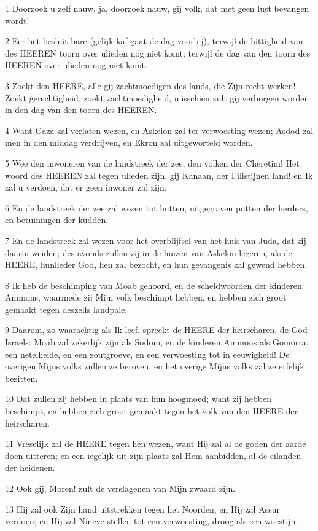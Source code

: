 \par 1 Doorzoek u zelf nauw, ja, doorzoek nauw, gij volk, dat met geen lust bevangen wordt!
\par 2 Eer het besluit bare (gelijk kaf gaat de dag voorbij), terwijl de hittigheid van des HEEREN toorn over ulieden nog niet komt; terwijl de dag van den toorn des HEEREN over ulieden nog niet komt.
\par 3 Zoekt den HEERE, alle gij zachtmoedigen des lands, die Zijn recht werken! Zoekt gerechtigheid, zoekt zachtmoedigheid, misschien zult gij verborgen worden in den dag van den toorn des HEEREN.
\par 4 Want Gaza zal verlaten wezen, en Askelon zal ter verwoesting wezen; Asdod zal men in den middag verdrijven, en Ekron zal uitgeworteld worden.
\par 5 Wee den inwoneren van de landstreek der zee, den volken der Cheretim! Het woord des HEEREN zal tegen ulieden zijn, gij Kanaan, der Filistijnen land! en Ik zal u verdoen, dat er geen inwoner zal zijn.
\par 6 En de landstreek der zee zal wezen tot hutten, uitgegraven putten der herders, en betuiningen der kudden.
\par 7 En de landstreek zal wezen voor het overblijfsel van het huis van Juda, dat zij daarin weiden; des avonds zullen zij in de huizen van Askelon legeren, als de HEERE, hunlieder God, hen zal bezocht, en hun gevangenis zal gewend hebben.
\par 8 Ik heb de beschimping van Moab gehoord, en de scheldwoorden der kinderen Ammons, waarmede zij Mijn volk beschimpt hebben, en hebben zich groot gemaakt tegen deszelfs landpale.
\par 9 Daarom, zo waarachtig als Ik leef, spreekt de HEERE der heirscharen, de God Israels: Moab zal zekerlijk zijn als Sodom, en de kinderen Ammons als Gomorra, een netelheide, en een zoutgroeve, en een verwoesting tot in eeuwigheid! De overigen Mijns volks zullen ze beroven, en het overige Mijns volks zal ze erfelijk bezitten.
\par 10 Dat zullen zij hebben in plaats van hun hoogmoed; want zij hebben beschimpt, en hebben zich groot gemaakt tegen het volk van den HEERE der heirscharen.
\par 11 Vreselijk zal de HEERE tegen hen wezen, want Hij zal al de goden der aarde doen uitteren; en een iegelijk uit zijn plaats zal Hem aanbidden, al de eilanden der heidenen.
\par 12 Ook gij, Moren! zult de verslagenen van Mijn zwaard zijn.
\par 13 Hij zal ook Zijn hand uitstrekken tegen het Noorden, en Hij zal Assur verdoen; en Hij zal Nineve stellen tot een verwoesting, droog als een woestijn.
